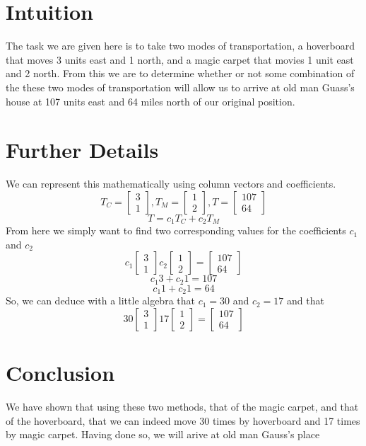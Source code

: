 \documentclass{article}
\begin{document}
\section{Intuition}
The task we are given here is to take two modes of transportation, a hoverboard that moves
3 units east and 1 north, and a magic carpet that movies 1 unit east and 2 north.
From this we are to determine whether or not some combination of the these two
modes of transportation will allow us to arrive at old man Guass's house at
107 units east and 64 miles north of our original position.
\section{Further Details}
We can represent this mathematically using column vectors and coefficients.
\[
T_C = \begin{bmatrix}
3 \\ 1 
\end{bmatrix}
,
T_M = \begin{bmatrix}
1 \\ 2
\end{bmatrix}
,
T = \begin{bmatrix}
107 \\ 64
\end{bmatrix}
\]
\[
T = {c_1}{T_C}+{c_2}{T_M}
\]
From here we simply want to find two corresponding values for the 
coefficients ${c_1}$ and ${c_2}$
\[
{c_1}
\begin{bmatrix}
3 \\ 1 
\end{bmatrix}
{c_2}
\begin{bmatrix}
1 \\ 2
\end{bmatrix}
=
\begin{bmatrix}
107 \\ 64
\end{bmatrix}
\]
\[{c_1}3+{c_2}1=107\]
\[{c_1}1+{c_2}1=64\]
So, we can deduce with a little algebra that ${c_1}=30$ and ${c_2}=17$ and that
\[
30
\begin{bmatrix}
3 \\ 1 
\end{bmatrix}
17
\begin{bmatrix}
1 \\ 2
\end{bmatrix}
=
\begin{bmatrix}
107 \\ 64
\end{bmatrix}
\]
\section{Conclusion}
We have shown that using these two methods, that of the magic carpet, and that of
the hoverboard, that we can indeed move 30 times by hoverboard and 17 times by
magic carpet. Having done so, we will arive at old man Gauss's place
\end{document}
